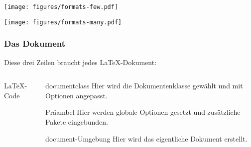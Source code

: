 \begin{frame}[t]
  \centering
  \texttt{[image: figures/formats-few.pdf]}
  \hspace{1.40em}
\end{frame}
\begin{frame}[t]
  \centering
  \texttt{[image: figures/formats-many.pdf]}
\end{frame}

\begin{frame}[fragile]
    \frametitle{Das Dokument}
    Diese drei Zeilen braucht jedes \LaTeX-Dokument:
    \begin{columns}[T]
        \begin{column}{0.47\textwidth}
            \begin{block}{\LaTeX-Code}
            \end{block}
        \end{column}
        \begin{column}{0.47\textwidth}
            \begin{block}{documentclass}
                Hier wird die Dokumentenklasse gewählt und mit Optionen angepasst. \\
            \end{block}
            \begin{block}{Präambel}
                Hier werden globale Optionen gesetzt und zusätzliche Pakete eingebunden.\\
            \end{block}
            \begin{block}{document-Umgebung}
                Hier wird das eigentliche Dokument erstellt.
            \end{block}
        \end{column}
    \end{columns}
\end{frame}

